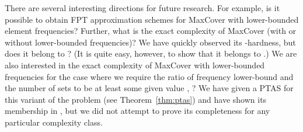 \documentclass[11pt]{article}
\begin{document}
There are several interesting directions for future research. For
example, is it possible to obtain FPT approximation schemes for
MaxCover with lower-bounded element frequencies? Further, what is the
exact complexity of MaxCover (with or without lower-bounded
frequencies)? We have quickly observed its -hardness, but does
it belong to ? (It is quite easy, however, to show that it
belongs to .) We are also interested in the exact complexity
of MaxCover with lower-bounded frequencies for the case where we
require the ratio of frequency lower-bound and the number of sets to
be at least some given value , ? We have given
a PTAS for this variant of the problem (see Theorem~\ref{thm:ptas})
and have shown its membership in , but we did not attempt to
prove its completeness for any particular complexity class.
















\end{document}
